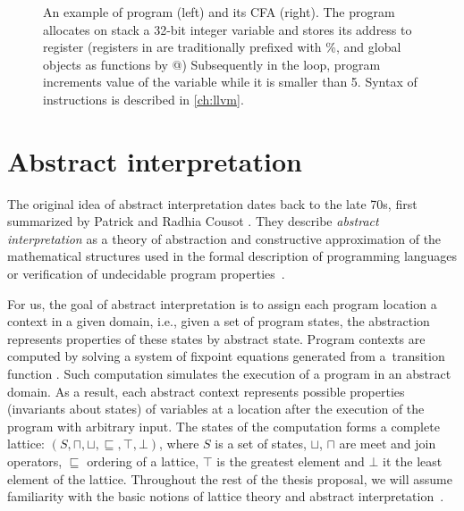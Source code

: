 \begin{figure}
\begin{minipage}[t]{0.48\textwidth}
\begin{tikzpicture}[node distance=1.1em]
\end{tikzpicture}
\end{minipage}

\caption{An example of \llvm program (left) and its CFA (right).  The program
allocates on stack a 32-bit integer variable and stores its address to register
 (registers in \llvm are traditionally prefixed with \%,
and global objects as functions by @) Subsequently in the loop, program
increments value of the variable while it is smaller than 5. Syntax of \llvm
instructions is described in \autoref{ch:llvm}.}
\label{fig:cfa}
\end{figure}

\section{Abstract interpretation}
\label{sec:abstraction}

The original idea of abstract interpretation dates back to the late 70s, first
summarized by Patrick and Radhia Cousot \cite{Cousot1977}.
They describe \emph{abstract interpretation} as a theory of abstraction and
constructive approximation of the mathematical structures used in the formal
description of programming languages or verification of undecidable program
properties~\cite{Cousot2012}.

For us, the goal of abstract interpretation is to assign each program location
a context in a given domain, i.e., given a set of program states, the
abstraction represents properties of these states by abstract state. Program
contexts are computed by solving a system of fixpoint equations generated from
a~transition function \cite{Cousot1977}. Such computation simulates the
execution of a program in an abstract domain. As a result, each abstract
context represents possible properties (invariants about states) of variables
at a location after the execution of the program with arbitrary input. The
states of the computation forms a complete lattice:
$(S, \sqcap, \sqcup, \sqsubseteq, \top, \bot)$, where $S$ is a set of states,
$\sqcup$, $\sqcap$ are meet and join operators, $\sqsubseteq$ ordering of a
lattice, $\top$ is the greatest element and $\bot$ it the least element of the
lattice. Throughout the rest of the thesis proposal, we will assume familiarity
with the basic notions of lattice theory \cite{Birkhoff1940} and abstract
interpretation~\cite{Cousot1977}.

